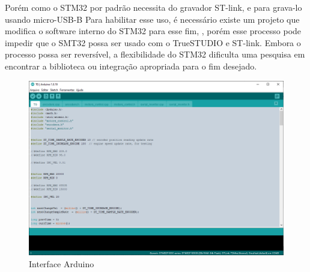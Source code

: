 Porém como o STM32 por padrão necessita do gravador ST-link, e para grava-lo usando micro-USB-B
Para habilitar esse uso, é necessário existe um projeto que modifica o software interno do STM32 para esse fim, 
\cite{stm32duino_bootloader}, porém esse processo pode impedir que o SMT32 possa ser usado  com o TrueSTUDIO e ST-link.
Embora o processo possa ser reversível, a flexibilidade do STM32 dificulta uma pesquisa em encontrar
a biblioteca ou integração apropriada para o fim desejado.


\begin{figure}[ht]
	\centering
	\includegraphics[width=1\textwidth]{figures/arduino}
	\caption{Interface Arduino}
\end{figure}



